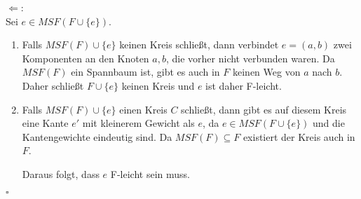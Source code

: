 \documentclass[11pt,a4paper,ngerman]{article}
\begin{document}
$\Leftarrow$:\\
    Sei $e \in MSF(F \cup \{ e\})$.
    \begin{enumerate}[(1)]
        \item Falls $MSF(F) \cup \{ e \}$ keinen Kreis schließt, dann verbindet $e = (a,b)$ zwei Komponenten an den Knoten $a,b$, die
            vorher nicht verbunden waren. Da $MSF(F)$ ein Spannbaum ist, gibt es auch in $F$ keinen Weg von $a$ nach $b$.
            Daher schließt $F \cup \{ e \}$ keinen Kreis und $e$ ist daher F-leicht.
        \item Falls $MSF(F) \cup \{ e \}$ einen Kreis $C$ schließt, dann gibt es auf diesem Kreis eine Kante $e'$ mit kleinerem Gewicht als $e$,
            da $e \in MSF(F \cup \{ e \})$ und die Kantengewichte eindeutig sind. Da $MSF(F) \subseteq F$ existiert der Kreis auch in $F$.

            Daraus folgt, dass $e$ F-leicht sein muss.
    \end{enumerate}
    \mbox{}\hfill $\square$
\label{LastPage}
\end{document}
